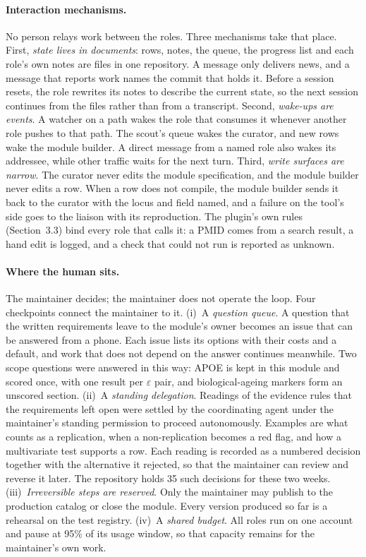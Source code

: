 \paragraph{Interaction mechanisms.} No person relays work between the roles.
Three mechanisms take that place. First, \emph{state lives in documents}:
rows, notes, the queue, the progress list and each role's own notes are files
in one repository. A message only delivers news, and a message that reports
work names the commit that holds it. Before a session resets, the role
rewrites its notes to describe the current state, so the next session
continues from the files rather than from a transcript. Second, \emph{wake-ups
are events}. A watcher on a path wakes the role that consumes it whenever
another role pushes to that path. The scout's queue wakes the curator, and new
rows wake the module builder. A direct message from a named role also wakes
its addressee, while other traffic waits for the next turn. Third, \emph{write
surfaces are narrow}. The curator never edits the module specification, and
the module builder never edits a row. When a row does not compile, the module
builder sends it back to the curator with the locus and field named, and a
failure on the tool's side goes to the liaison with its reproduction. The
plugin's own rules (Section~3.3) bind every role that calls it: a PMID comes
from a search result, a hand edit is logged, and a check that could not run is
reported as unknown.

\paragraph{Where the human sits.} The maintainer decides; the maintainer does
not operate the loop. Four checkpoints connect the maintainer to it.
(i)~A \emph{question queue}. A question that the written requirements leave
to the module's owner becomes an issue that can be answered from a phone. Each
issue lists its options with their costs and a default, and work that does
not depend on the answer continues meanwhile. Two scope questions were
answered in this way: APOE is kept in this module and scored once, with one
result per $\varepsilon$ pair, and biological-ageing markers form an unscored
section. (ii)~A \emph{standing delegation}. Readings of the evidence rules
that the requirements left open were settled by the coordinating agent under
the maintainer's standing permission to proceed autonomously. Examples are
what counts as a replication, when a non-replication becomes a red flag, and
how a multivariate test supports a row. Each reading is recorded as a numbered
decision together with the alternative it rejected, so that the maintainer can
review and reverse it later. The repository holds 35 such decisions for these
two weeks. (iii)~\emph{Irreversible steps are reserved}. Only the maintainer
may publish to the production catalog or close the module. Every version
produced so far is a rehearsal on the test registry. (iv)~A \emph{shared
budget}. All roles run on one account and pause at 95\% of its usage window,
so that capacity remains for the maintainer's own work.

